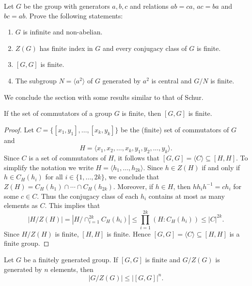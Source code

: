 \begin{exercise}
    Let $G$ be the group with generators $a,b,c$ and 
    relations $ab=ca$, $ac=ba$ and $bc=ab$. Prove the following statements:
    \begin{enumerate}
        \item $G$ is infinite and non-abelian.
        \item $Z(G)$ has finite index in $G$ and every conjugacy class of $G$ is finite.
        \item $[G,G]$ is finite. 
        \item The subgroup $N=\langle a^2\rangle$ of $G$ 
        generated by $a^2$ is central 
        and $G/N$ is finite.
    \end{enumerate}
\end{exercise}

We conclude the section with some results similar to that of Schur. 

\begin{theorem}[Niroomand]
\label{thm:Niroomand}
	If the set of commutators of a group $G$ is finite, then 
	$[G,G]$ is finite.
\end{theorem}

\begin{proof}
 	Let $C=\{[x_1,y_1],\dots,[x_k,y_k]\}$ be the (finite) set of commutators of $G$ and  
	\[
    H=\langle x_1,x_2,\dots,x_k,y_1,y_2,\dots,y_k\rangle.
    \]
    Since $C$ is a set of commutators of $H$, 
	it follows that 
	$[G,G]=\langle C\rangle\subseteq [H,H]$. To simplify the notation we write 
	$H=\langle h_1,\dots,h_{2k}\rangle$. 	
 	Since $h\in Z(H)$ if and only if $h\in C_H(h_i)$ for all 
	$i\in\{1,\dots,2k\}$, we conclude that $Z(H)=C_H(h_1)\cap\cdots\cap C_H(h_{2k})$. Moreover, if 
	$h\in H$, then $hh_ih^{-1}=ch_i$ for some $c\in C$. Thus the conjugacy class of each 
	$h_i$ contains at most as many elements as $C$. This implies that 
	\[
		|H/Z(H)|=|H/\cap_{i=1}^{2k} C_H(h_i)|\leq\prod_{i=1}^{2k} (H:C_H(h_i))\leq |C|^{2k}.
	\]
	Since $H/Z(H)$ is finite, $[H,H]$ is finite. Hence  
	$[G,G]=\langle C\rangle\subseteq [H,H]$ 
	is a finite group. 
\end{proof}

\begin{theorem}
	\label{thm:HiltonNiroomand}
	Let $G$ be a finitely generated group. If $[G,G]$ is finite and $G/Z(G)$ is generated by
	$n$ elements, then  
	\[
	|G/Z(G)|\leq |[G,G]|^n. 
	\]
\end{theorem}

